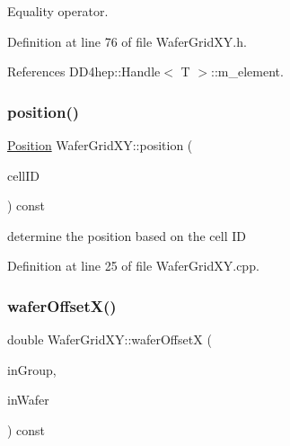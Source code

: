 Equality operator. 



Definition at line 76 of file Wafer\+Grid\+X\+Y.\+h.



References D\+D4hep\+::\+Handle$<$ T $>$\+::m\+\_\+element.

\hypertarget{class_d_d4hep_1_1_geometry_1_1_wafer_grid_x_y_acfb0951547a5ed2e4b909c52dc867967}{}\label{class_d_d4hep_1_1_geometry_1_1_wafer_grid_x_y_acfb0951547a5ed2e4b909c52dc867967} 
\subsubsection{\texorpdfstring{position()}{position()}}
{\footnotesize\ttfamily \hyperlink{namespace_d_d4hep_1_1_geometry_a55083902099d03506c6db01b80404900}{Position} Wafer\+Grid\+X\+Y\+::position (\begin{DoxyParamCaption}\item[{const Cell\+ID \&}]{cell\+ID }\end{DoxyParamCaption}) const}



determine the position based on the cell ID 



Definition at line 25 of file Wafer\+Grid\+X\+Y.\+cpp.

\hypertarget{class_d_d4hep_1_1_geometry_1_1_wafer_grid_x_y_a9af760dcaf08746a829dc9ce75a80ae9}{}\label{class_d_d4hep_1_1_geometry_1_1_wafer_grid_x_y_a9af760dcaf08746a829dc9ce75a80ae9} 
\subsubsection{\texorpdfstring{wafer\+Offset\+X()}{waferOffsetX()}}
{\footnotesize\ttfamily double Wafer\+Grid\+X\+Y\+::wafer\+OffsetX (\begin{DoxyParamCaption}\item[{int}]{in\+Group,  }\item[{int}]{in\+Wafer }\end{DoxyParamCaption}) const}



